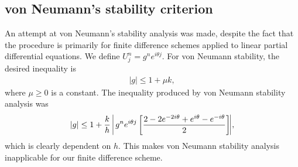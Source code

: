 \subsection*{von Neumann's stability criterion}
An attempt at von Neumann's stability analysis was made, despite the fact that the procedure is primarily for finite difference schemes applied to linear partial differential equations. We define $U_{j}^{n} = g^{n}e^{i\theta j}$. For von Neumann stability, the desired inequality is
\begin{align}
|g| \leq 1 + \mu k,
\end{align}
where $\mu \geq 0$ is a constant. 
The inequality produced by von Neumann stability analysis was
\begin{align}
|g| \leq 1+ \frac{k}{h}\;\vline \;g^{n}e^{i\theta j}\left[\frac{2-2e^{-2i\theta}+ e^{i\theta} - e^{-i\theta}}{2}\right]\vline,
\end{align}
which is clearly dependent on $h$. This makes von Neumann stability analysis inapplicable for our finite difference scheme.

